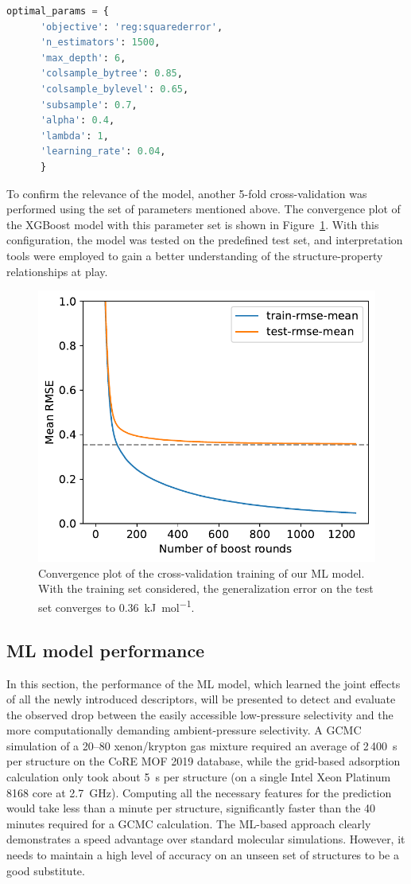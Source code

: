 \documentclass[main]{subfiles}
\begin{document}
\begin{lstlisting}[language=Python]
  optimal_params = {
      'objective': 'reg:squarederror',
      'n_estimators': 1500,
      'max_depth': 6,
      'colsample_bytree': 0.85,
      'colsample_bylevel': 0.65,
      'subsample': 0.7,
      'alpha': 0.4,
      'lambda': 1,
      'learning_rate': 0.04,
      }
  \end{lstlisting}

To confirm the relevance of the model, another 5-fold cross-validation was performed using the set of parameters mentioned above. The convergence plot of the XGBoost model with this parameter set is shown in Figure~\ref{fgr:convplot}. With this configuration, the model was tested on the predefined test set, and interpretation tools were employed to gain a better understanding of the structure-property relationships at play.

\begin{figure}[ht]
  \centering
    \includegraphics[width=0.60\linewidth]{figures/4-ml/SI_figure/convergence_plot.pdf}
    \caption{Convergence plot of the cross-validation training of our ML model. With the training set considered, the generalization error on the test set converges to 0.36~\si{\kilo\joule\per\mole}.}\label{fgr:convplot}
  \end{figure}

\subsection{ML model performance}

In this section, the performance of the ML model, which learned the joint effects of all the newly introduced descriptors, will be presented to detect and evaluate the observed drop between the easily accessible low-pressure selectivity and the more computationally demanding ambient-pressure selectivity. A GCMC simulation of a 20–80 xenon/krypton gas mixture required an average of 2\,400~\si{\second} per structure on the CoRE MOF 2019 database, while the grid-based adsorption calculation only took about \SI{5}{\second} per structure (on a single Intel Xeon Platinum 8168 core at \SI{2.7}{\giga\hertz}). Computing all the necessary features for the prediction would take less than a minute per structure, significantly faster than the 40 minutes required for a GCMC calculation. The ML-based approach clearly demonstrates a speed advantage over standard molecular simulations. However, it needs to maintain a high level of accuracy on an unseen set of structures to be a good substitute.
\end{document}

